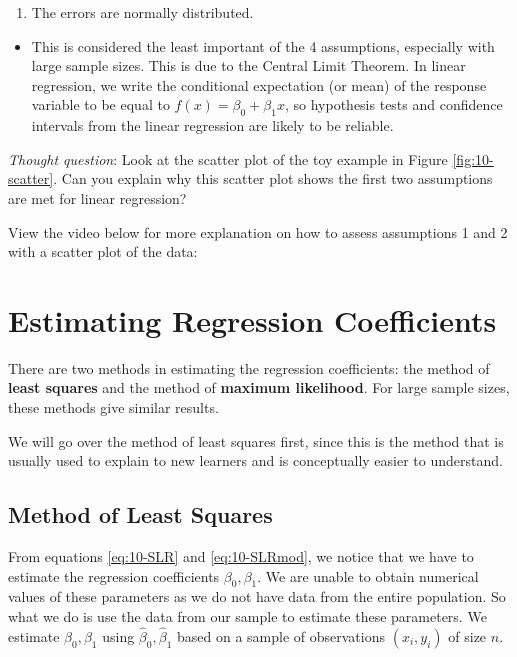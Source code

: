 \documentclass[
]{book}
\providecommand{\tightlist}{%
  \setlength{\itemsep}{0pt}\setlength{\parskip}{0pt}}
\begin{document}
\begin{enumerate}
\def\labelenumi{\arabic{enumi}.}
\setcounter{enumi}{3}
\tightlist
\item
  The errors are normally distributed.
\end{enumerate}

\begin{itemize}
\tightlist
\item
  This is considered the least important of the 4 assumptions, especially with large sample sizes. This is due to the Central Limit Theorem. In linear regression, we write the conditional expectation (or mean) of the response variable to be equal to \(f(x) = \beta_0 + \beta_1 x\), so hypothesis tests and confidence intervals from the linear regression are likely to be reliable.
\end{itemize}

\emph{Thought question}: Look at the scatter plot of the toy example in Figure \ref{fig:10-scatter}. Can you explain why this scatter plot shows the first two assumptions are met for linear regression?

View the video below for more explanation on how to assess assumptions 1 and 2 with a scatter plot of the data:

\hypertarget{estSLR}{%
\section{Estimating Regression Coefficients}\label{estSLR}}

There are two methods in estimating the regression coefficients: the method of \textbf{least squares} and the method of \textbf{maximum likelihood}. For large sample sizes, these methods give similar results.

We will go over the method of least squares first, since this is the method that is usually used to explain to new learners and is conceptually easier to understand.

\hypertarget{method-of-least-squares}{%
\subsection{Method of Least Squares}\label{method-of-least-squares}}

From equations \eqref{eq:10-SLR} and \eqref{eq:10-SLRmod}, we notice that we have to estimate the regression coefficients \(\beta_0, \beta_1\). We are unable to obtain numerical values of these parameters as we do not have data from the entire population. So what we do is use the data from our sample to estimate these parameters. We estimate \(\beta_0,\beta_1\) using \(\hat{\beta}_0,\hat{\beta}_1\) based on a sample of observations \((x_i,y_i)\) of size \(n\).
\end{document}
